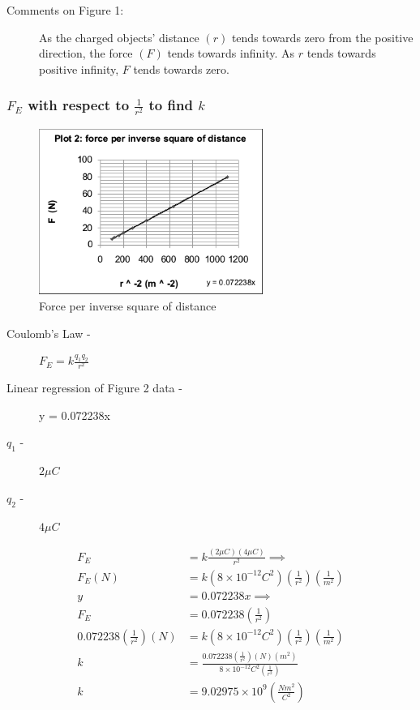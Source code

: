\documentclass{article}
\begin{document}
\begin{description}
	\item[Comments on Figure 1:] As the charged objects' distance $(r)$ tends towards zero
		from the positive direction, the force $(F)$ tends towards infinity. As $r$ tends
		towards positive infinity, $F$ tends towards zero.
\end{description}

\subsubsection{$F_{E}$ with respect to $\frac{1}{r^2}$ to find $k$}%

\begin{figure}[H]
	\begin{center}
		\includegraphics[width=0.65\textwidth]{plot2} %
		\caption{Force per inverse square of distance}
	\end{center}
\end{figure}


\begin{description}
	\item[Coulomb's Law -]
		$F_{E} = k \frac{q_1 q_2}{r^2}$
	\item[Linear regression of Figure 2 data -] y = 0.072238x
	\item[$q_1$ -] $2 \mu C$
	\item[$q_2$ -] $4 \mu C$
\end{description}

\begin{align*}
	F_{E} &= k \frac{(2 \mu C)(4 \mu C)}{r^2} \implies \\
	F_{E} (N) &= k \left( 8 \times 10^{-12} C^2 \right)  \left( \frac{1}{r^2} \right) \left( \frac{1}{m^2} \right)  \\
	y &= 0.072238x \implies \\
	F_{E} &= 0.072238 \left( \frac{1}{r^2} \right)  \\
	0.072238 \left( \frac{1}{r^2} \right) (N) &=  k \left( 8 \times 10^{-12} C^2 \right) \left( \frac{1}{r^2} \right) \left( \frac{1}{m^2} \right)\\
	k &= \frac{  0.072238 \left( \frac{1}{r^2} \right) (N)(m^2)}{8 \times 10^{-12} C^2 \left(  \frac{1}{r^2}\right)  } \\
	k &= \boxed{9.02975 \times 10^{9}}\left( \frac{N m^2}{C^2} \right)  \\
\end{align*}
\end{document}
